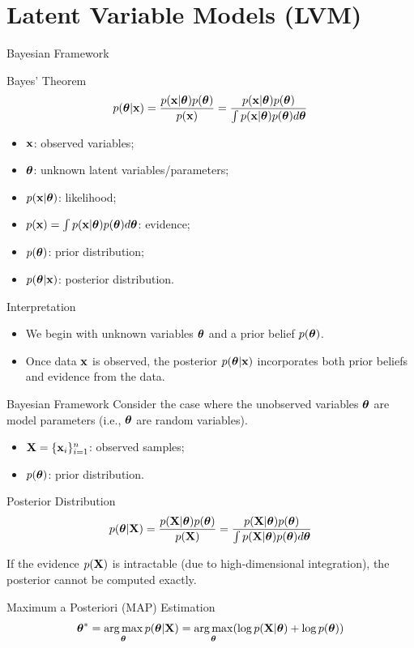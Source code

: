 \documentclass{beamer}
\begin{document}
\section{Latent Variable Models (LVM)}
\begin{frame}{Bayesian Framework}
	\begin{block}{Bayes' Theorem}
		\vspace{-0.3cm}
		\[
			p(\boldsymbol{\theta}| \mathbf{x}) = \frac{p(\mathbf{x} | \boldsymbol{\theta}) p(\boldsymbol{\theta})}{p(\mathbf{x})} = \frac{p(\mathbf{x} | \boldsymbol{\theta}) p(\boldsymbol{\theta})}{\int p(\mathbf{x} | \boldsymbol{\theta}) p(\boldsymbol{\theta}) d \boldsymbol{\theta}} 
		\]
		\vspace{-0.3cm}
		\begin{itemize}
			\item $\mathbf{x}$: observed variables; 
			\item $\boldsymbol{\theta}$: unknown latent variables/parameters;
			\item $p(\mathbf{x} | \boldsymbol{\theta})$: likelihood;
			\item $p(\mathbf{x}) = \int p(\mathbf{x} | \boldsymbol{\theta}) p(\boldsymbol{\theta}) d\boldsymbol{\theta}$: evidence;
			\item $p(\boldsymbol{\theta})$: prior distribution;
			\item $p(\boldsymbol{\theta}| \mathbf{x})$: posterior distribution.
		\end{itemize}
	\end{block}
	\begin{block}{Interpretation}
		\begin{itemize}
			\item We begin with unknown variables $\boldsymbol{\theta}$ and a prior belief $p(\boldsymbol{\theta})$.
			\item Once data $\mathbf{x}$ is observed, the posterior $p(\boldsymbol{\theta}| \mathbf{x})$ incorporates both prior beliefs and evidence from the data.
		\end{itemize} 
	\end{block}
\end{frame}
\begin{frame}{Bayesian Framework}
	Consider the case where the unobserved variables $\boldsymbol{\theta}$ are model parameters (i.e., $\boldsymbol{\theta}$ are random variables).
	\begin{itemize}
		\item $\mathbf{X} = \{\mathbf{x}_i\}_{i=1}^n$: observed samples;
		\item $p(\boldsymbol{\theta})$: prior distribution.
	\end{itemize}
	\begin{block}{Posterior Distribution}
		\[
			p(\boldsymbol{\theta} | \mathbf{X}) = \frac{p(\mathbf{X} | \boldsymbol{\theta}) p(\boldsymbol{\theta})}{p(\mathbf{X})} = \frac{p(\mathbf{X} | \boldsymbol{\theta}) p(\boldsymbol{\theta})}{\int p(\mathbf{X} | \boldsymbol{\theta}) p(\boldsymbol{\theta}) d \boldsymbol{\theta}} 
		\]
		\vspace{-0.2cm}
	\end{block}
	If the evidence $p(\mathbf{X})$ is intractable (due to high-dimensional integration), the posterior cannot be computed exactly.
    \begin{block}{Maximum a Posteriori (MAP) Estimation}
	    \vspace{-0.2cm}
	    \[
	        \boldsymbol{\theta}^* = \operatorname*{arg\,max}_{\boldsymbol{\theta}} p(\boldsymbol{\theta} | \mathbf{X}) = \operatorname*{arg\,max}_{\boldsymbol{\theta}} (\log p(\mathbf{X} | \boldsymbol{\theta}) + \log p(\boldsymbol{\theta}))
	    \]
    \end{block}
\end{frame}
\end{document}
